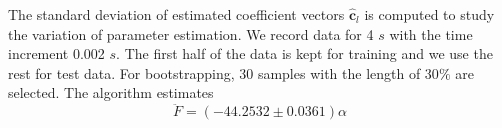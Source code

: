 \documentclass[letterpaper,12pt]{article}
\begin{document}
The standard deviation of estimated coefficient vectors $\hat{\mathbf{c}}_{l}$ is computed to study the variation of parameter estimation. We record data for 4 $s$ with the time increment 0.002 $s$. The first half of the data is kept for training and we use the rest for test data. For bootstrapping, 30 samples with the length of 30$\%$ are selected. The algorithm estimates 
\begin{equation}
\ddot{F}=(-44.2532 \pm 0.0361) \alpha
\label{EqEstimated}%
\end{equation}



 
\end{document}
